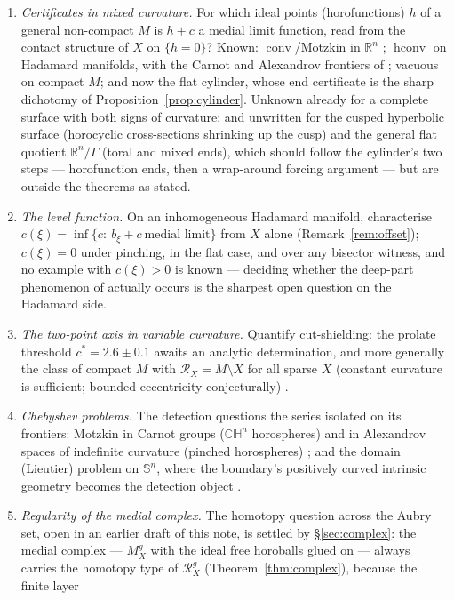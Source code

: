 \documentclass[11pt]{article}
\theoremstyle{remark}
\newcommand{\R}{\mathbb{R}}
\newcommand{\X}{X}
\newcommand{\Mg}{M^{g}_{\X}}
\newcommand{\Rx}{\mathcal{R}_{\X}}
\newcommand{\Rg}{\mathcal{R}^{g}_{\X}}
\newcommand{\conv}{\operatorname{conv}}
\newcommand{\hconv}{\operatorname{hconv}}
\newcommand{\Sn}{\mathbb{S}^{n}}
\begin{document}
\begin{enumerate}[label=(\arabic*)]
\item\emph{Certificates in mixed curvature.} For which ideal points
(horofunctions) $h$ of a general non-compact $M$ is $h+c$ a medial
limit function, read from the contact structure of $\X$ on
$\{h=0\}$? Known: $\conv$/Motzkin in $\R^{n}$ \cite{Bia,Mot};
$\hconv$ on Hadamard manifolds, with the Carnot and Alexandrov
frontiers of \cite[\S9--10]{R3}; vacuous on compact $M$; and now the
flat cylinder, whose end certificate is the sharp dichotomy of
Proposition~\ref{prop:cylinder}. Unknown already for a complete
surface with both signs of curvature; and unwritten for the cusped
hyperbolic surface (horocyclic cross-sections shrinking up the cusp)
and the general flat quotient $\R^{n}/\Gamma$ (toral and mixed ends),
which should follow the cylinder's two steps --- horofunction ends,
then a wrap-around forcing argument --- but are outside the theorems
as stated.
\item\emph{The level function.} On an inhomogeneous Hadamard
manifold, characterise
$c(\xi)=\inf\{c:\ b_{\xi}+c\ \text{medial limit}\}$ from $\X$ alone
(Remark~\ref{rem:offset}); $c(\xi)=0$ under pinching, in the flat
case, and over any bisector witness, and no example with
$c(\xi)>0$ is known --- deciding whether the deep-part phenomenon of
\cite[Thm.~3.4]{R3} actually occurs is the sharpest open question on
the Hadamard side.
\item\emph{The two-point axis in variable curvature.} Quantify
cut-shielding: the prolate threshold $c^{\ast}=2.6\pm0.1$ awaits an
analytic determination, and more generally the class of compact $M$
with $\Rx=M\setminus\X$ for all sparse $\X$ (constant curvature is
sufficient; bounded eccentricity conjecturally) \cite{Sph,Tri}.
\item\emph{Chebyshev problems.} The detection questions the series
isolated on its frontiers: Motzkin in Carnot groups
($\mathbb{CH}^{n}$ horospheres) and in Alexandrov spaces of
indefinite curvature (pinched horospheres) \cite[\S10]{R3}; and the
domain (Lieutier) problem on $\Sn$, where the boundary's positively
curved intrinsic geometry becomes the detection object
\cite[\S7]{Tri}.
\item\emph{Regularity of the medial complex.} The homotopy question
across the Aubry set, open in an earlier draft of this note, is
settled by \S\ref{sec:complex}: the medial complex --- $\Mg$ with
the ideal free horoballs glued on --- always carries the homotopy
type of $\Rg$ (Theorem~\ref{thm:complex}), because the finite layer

\end{enumerate}
\end{document}
